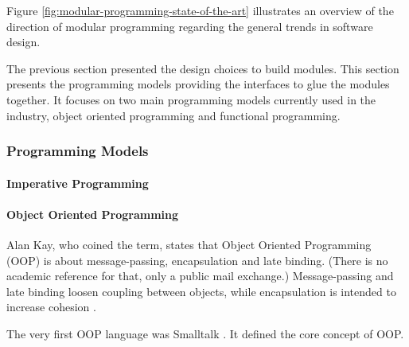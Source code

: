 Figure \ref{fig:modular-programming-state-of-the-art} illustrates an overview of the direction of modular programming regarding the general trends in software design.


The previous section presented the design choices to build modules.
This section presents the programming models providing the interfaces to glue the modules together.
It focuses on two main programming models currently used in the industry, object oriented programming and functional programming.


\subsubsection{Programming Models}


\paragraph{Imperative Programming}


\paragraph{Object Oriented Programming}


Alan Kay, who coined the term, states that Object Oriented Programming (OOP) is about message-passing, encapsulation and late binding.
(There is no academic reference for that, only a public mail exchange.)
Message-passing and late binding loosen coupling between objects, while encapsulation is intended to increase cohesion .

The very first OOP language was Smalltalk \cite{Goldberg1984}.
It defined the core concept of OOP.

